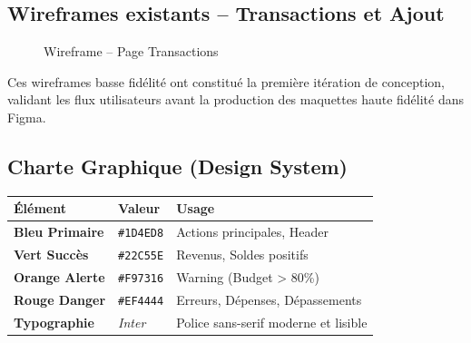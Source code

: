 \subsection{Wireframes existants -- Transactions et Ajout}

\begin{figure}[H]
    \centering
    \begin{minipage}{0.48\textwidth}
        \centering
        \caption{Wireframe basse fidélité -- Dashboard (version initiale)}
        \label{fig:wireframe-dashboard}
    \end{minipage}\hfill
    \begin{minipage}{0.48\textwidth}
        \centering
        \caption{Wireframe -- Page Transactions}
        \label{fig:wireframe-transactions}
    \end{minipage}
\end{figure}

Ces wireframes basse fidélité ont constitué la première itération de conception, validant les flux utilisateurs avant la production des maquettes haute fidélité dans Figma.

\subsection{Charte Graphique (Design System)}

\begin{center}
\small
\begin{tabular}{|p{}|p{}|p{}|}
\hline
\textbf{Élément} & \textbf{Valeur} & \textbf{Usage} \\
\hline
\textbf{Bleu Primaire} & \texttt{\#1D4ED8} & Actions principales, Header \\
\hline
\textbf{Vert Succès} & \texttt{\#22C55E} & Revenus, Soldes positifs \\
\hline
\textbf{Orange Alerte} & \texttt{\#F97316} & Warning (Budget > 80\%) \\
\hline
\textbf{Rouge Danger} & \texttt{\#EF4444} & Erreurs, Dépenses, Dépassements \\
\hline
\textbf{Typographie} & \textit{Inter} & Police sans-serif moderne et lisible \\
\hline
\end{tabular}
\end{center}

